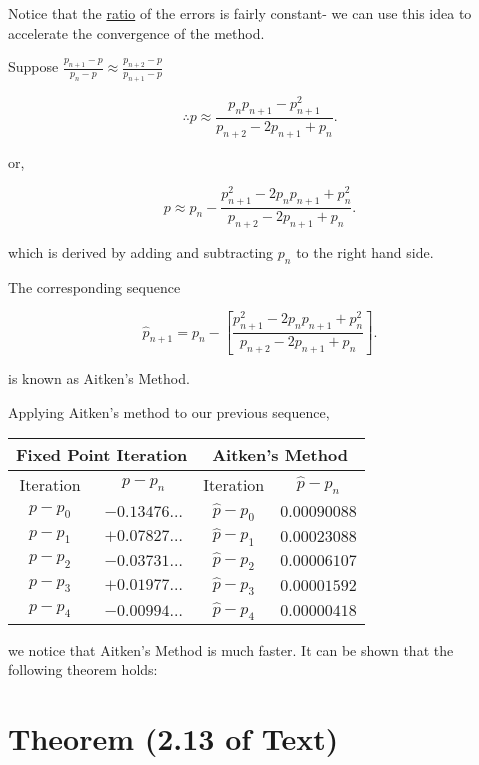 Notice that the \uline{ratio} of the errors is fairly constant- we can use this
idea to accelerate the convergence of the method.

Suppose $\displaystyle \frac{p_{n+1}-p}{p_n-p} \approx \frac{p_{n+2}-p}{p_{n+1}-p}$

\[
  \therefore p \approx \frac{p_n p_{n+1} - p_{n+1}^2}{p_{n+2}-2p_{n+1}+p_n}
.\]

or,

\[
  p \approx p_n - \frac{p_{n+1}^2 - 2p_n p_{n+1} + p_n^2}{p_{n+2}-2p_{n+1}+p_n}
.\]

which is derived by adding and subtracting $p_n$ to the right hand side.

The corresponding sequence

\[
  \hat{p}_{n+1} = p_n - \left[ \frac{p_{n+1}^2-2p_np_{n+1}+p_n^2}{p_{n+2}-2p_{n+1}+p_n} \right]
.\]

is known as Aitken's Method.

\pagebreak
Applying Aitken's method to our previous sequence,

\begin{table}[h]
    \centering
    \begin{tabular}{c c | c c}
        \toprule
        \multicolumn{2}{c|}{Fixed Point Iteration} & \multicolumn{2}{c}{Aitken's Method} \\
        \midrule
        Iteration & $p - p_n$ & Iteration & $\hat{p} - p_n$ \\
        \midrule
        $p - p_0$ & $-0.13476\ldots$ & $\hat{p} - p_0$ & $0.00090088$ \\
        $p - p_1$ & $+0.07827\ldots$ & $\hat{p} - p_1$ & $0.00023088$ \\
        $p - p_2$ & $-0.03731\ldots$ & $\hat{p} - p_2$ & $0.00006107$ \\
        $p - p_3$ & $+0.01977\ldots$ & $\hat{p} - p_3$ & $0.00001592$ \\
        $p - p_4$ & $-0.00994\ldots$ & $\hat{p} - p_4$ & $0.00000418$ \\
        \bottomrule
    \end{tabular}
\end{table}

we notice that Aitken's Method is much faster.
It can be shown that the following theorem holds:

\section{Theorem (2.13 of Text)}

